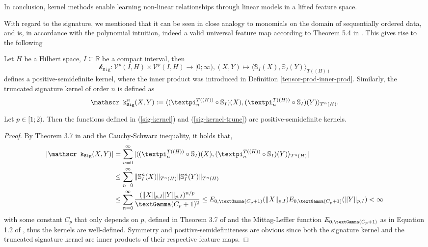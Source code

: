 \documentclass[openany]{book}
\begin{document}
In conclusion, kernel methods enable learning non-linear relationships through linear models in a lifted feature space.
\par With regard to the signature, we mentioned that it can be seen in close analogy to monomials on the domain of sequentially ordered data, and is, in accordance with the polynomial intuition, indeed a valid universal feature map according to Theorem 5.4 in \cite{chuchiero2023}. This gives rise to the following
\begin{definition}
    Let $H$ be a Hilbert space, $I\subseteq \mathbb R$ be a compact interval, then
    \begin{equation}\label{sig-kernel}
        \mathscr k_{\mathtt{Sig}}:\mathscr V^p(I,H)\times \mathscr V^p(I,H)\to [0;\infty),(X,Y)\mapsto\langle \mathbb S_{I}(X),\mathbb S_{I}(Y)\rangle_{T((H))}
    \end{equation}
    defines a positive-semidefinite kernel, where the inner product was introduced in Definition \ref{tensor-prod-inner-prod}. Similarly, the truncated signature kernel of order $n$ is defined as
    \begin{equation}\label{sig-kernel-trunc}
        \mathscr k_{\mathtt{Sig}}^n(X,Y):=\langle (\gpi_n^{T((H))}\circ \mathbb S_{I})(X),(\gpi_n^{T((H))}\circ \mathbb S_{I})(Y)\rangle_{T^n(H)}.
    \end{equation}
\end{definition}
\begin{theorem}
    Let $p\in [1;2)$. Then the functions defined in (\ref{sig-kernel}) and (\ref{sig-kernel-trunc}) are positive-semidefinite kernels.
    \begin{proof}
        By Theorem 3.7 in \cite{lyons2007} and the Cauchy-Schwarz inequality, it holds that,
        \begin{equation*}
        \begin{split}
            \vert \mathscr k_{\mathtt{Sig}}(X,Y)\vert &= \sum_{n=0}^\infty \vert  \langle (\gpi_n^{T((H))}\circ \mathbb S_{I})(X),(\gpi_n^{T((H))}\circ \mathbb S_{I})(Y)\rangle_{T^n(H)}\vert  \\ 
            &\leq \sum_{n=0}^\infty\|\mathbb S^n_I(X)\|_{T^n(H)}\|\mathbb S^n_I(Y)\|_{T^n(H)} \\
            &\leq \sum_{n=0}^\infty\frac{(\|X\|_{p,I}\|Y\|_{p,I})^{n/p}}{\gGamma(C_{p}+1)^2}\leq E_{0,\gGamma(C_{p}+1)}(\|X\|_{p,I})E_{0,\gGamma(C_{p}+1)}(\|Y\|_{p,I})<\infty
        \end{split}
        \end{equation*}
        with some constant $C_{p}$ that only depends on $p$, defined in Theorem 3.7 of \cite{lyons2007} and the Mittag-Leffler function $E_{0,\gGamma(C_{p}+1)}$ as in Equation 1.2 of \cite{haubold2011}, thus the kernels are well-defined.
        Symmetry and positive-semidefiniteness are obvious since both the signature kernel and the truncated signature kernel are inner products of their respective feature maps.
    \end{proof}
\end{theorem}
\end{document}
